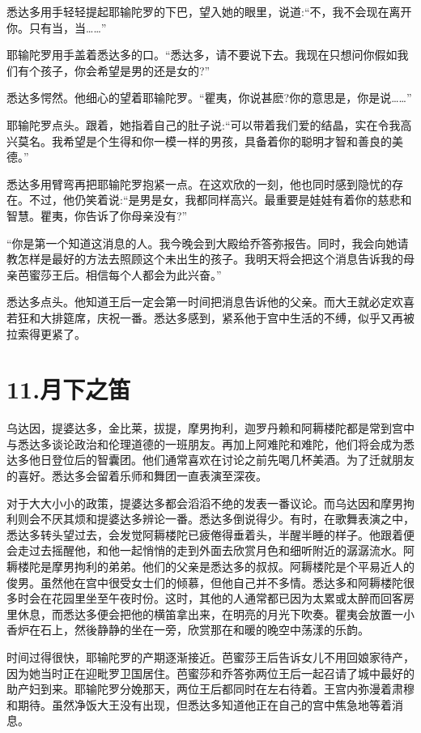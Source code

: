 \documentclass[12pt,twoside,openany]{book}
\begin{document}
悉达多用手轻轻提起耶输陀罗的下巴，望入她的眼里，说道:“不，我不会现在离开你。只有当，当……”

耶输陀罗用手盖着悉达多的口。“悉达多，请不要说下去。我现在只想问你假如我们有个孩子，你会希望是男的还是女的?”

悉达多愕然。他细心的望着耶输陀罗。“瞿夷，你说甚麽?你的意思是，你是说……”

耶输陀罗点头。跟着，她指着自己的肚子说:“可以带着我们爱的结晶，实在令我高兴莫名。我希望是个生得和你一模一样的男孩，具备着你的聪明才智和善良的美德。”

悉达多用臂弯再把耶输陀罗抱紧一点。在这欢欣的一刻，他也同时感到隐忧的存在。不过，他仍笑着说:“是男是女，我都同样高兴。最重要是娃娃有着你的慈悲和智慧。瞿夷，你告诉了你母亲没有?”

“你是第一个知道这消息的人。我今晚会到大殿给乔答弥报告。同时，我会向她请教怎样是最好的方法去照顾这个未出生的孩子。我明天将会把这个消息告诉我的母亲芭蜜莎王后。相信每个人都会为此兴奋。”

悉达多点头。他知道王后一定会第一时间把消息告诉他的父亲。而大王就必定欢喜若狂和大排筵席，庆祝一番。悉达多感到，紧系他于宫中生活的不缚，似乎又再被拉索得更紧了。

\chapter{11.月下之笛}\label{ch11}

乌达因，提婆达多，金比莱，拔提，摩男拘利，迦罗丹赖和阿耨楼陀都是常到宫中与悉达多谈论政治和伦理道德的一班朋友。再加上阿难陀和难陀，他们将会成为悉达多他日登位后的智囊团。他们通常喜欢在讨论之前先喝几杯美酒。为了迁就朋友的喜好。悉达多会留着乐师和舞团一直表演至深夜。

对于大大小小的政策，提婆达多都会滔滔不绝的发表一番议论。而乌达因和摩男拘利则会不厌其烦和提婆达多辨论一番。悉达多倒说得少。有时，在歌舞表演之中，悉达多转头望过去，会发觉阿耨楼陀已疲倦得垂着头，半醒半睡的样子。他跟着便会走过去摇醒他，和他一起悄悄的走到外面去欣赏月色和细听附近的潺潺流水。阿耨楼陀是摩男拘利的弟弟。他们的父亲是悉达多的叔叔。阿耨楼陀是个平易近人的俊男。虽然他在宫中很受女士们的倾慕，但他自己并不多情。悉达多和阿耨楼陀很多时会在花园里坐至午夜时份。这时，其他的人通常都已因为太累或太醉而回客房里休息，而悉达多便会把他的横笛拿出来，在明亮的月光下吹奏。瞿夷会放置一小香炉在石上，然後静静的坐在一旁，欣赏那在和暖的晚空中荡漾的乐韵。

时间过得很快，耶输陀罗的产期逐渐接近。芭蜜莎王后告诉女儿不用回娘家待产，因为她当时正在迎毗罗卫国居住。芭蜜莎和乔答弥两位王后一起召请了城中最好的助产妇到来。耶输陀罗分娩那天，两位王后都同时在左右待着。王宫内弥漫着肃穆和期待。虽然净饭大王没有出现，但悉达多知道他正在自己的宫中焦急地等着消息。
\end{document}
